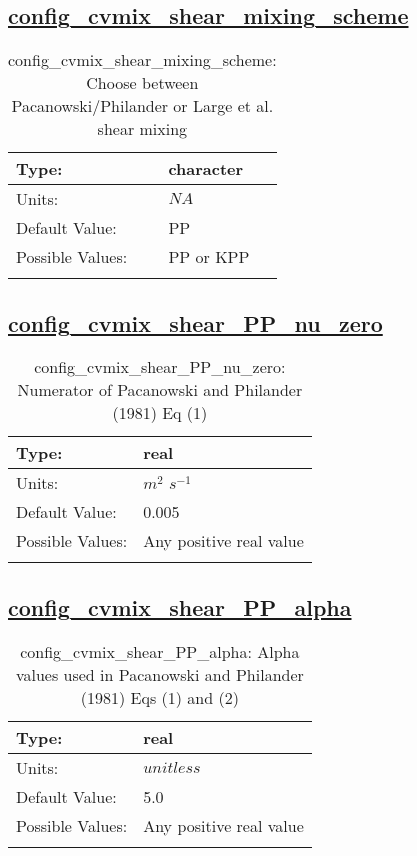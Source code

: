 \subsection[config\_cvmix\_shear\_mixing\_scheme]{\hyperref[sec:nm_tab_cvmix]{config\_cvmix\_shear\_mixing\_scheme}}
\label{subsec:nm_sec_config_cvmix_shear_mixing_scheme}
\begin{center}
\begin{longtable}{| p{2.0in} || p{4.0in} |}
    \hline
    Type: & character \\
    \hline
    Units: & $NA$ \\
    \hline
    Default Value: & PP \\
    \hline
    Possible Values: & PP or KPP \\
    \hline
    \caption{config\_cvmix\_shear\_mixing\_scheme: Choose between Pacanowski/Philander or Large et al. shear mixing}
\end{longtable}
\end{center}
\subsection[config\_cvmix\_shear\_PP\_nu\_zero]{\hyperref[sec:nm_tab_cvmix]{config\_cvmix\_shear\_PP\_nu\_zero}}
\label{subsec:nm_sec_config_cvmix_shear_PP_nu_zero}
\begin{center}
\begin{longtable}{| p{2.0in} || p{4.0in} |}
    \hline
    Type: & real \\
    \hline
    Units: & $m^2$ $s^{-1}$ \\
    \hline
    Default Value: & 0.005 \\
    \hline
    Possible Values: & Any positive real value \\
    \hline
    \caption{config\_cvmix\_shear\_PP\_nu\_zero: Numerator of Pacanowski and Philander (1981) Eq (1)}
\end{longtable}
\end{center}
\subsection[config\_cvmix\_shear\_PP\_alpha]{\hyperref[sec:nm_tab_cvmix]{config\_cvmix\_shear\_PP\_alpha}}
\label{subsec:nm_sec_config_cvmix_shear_PP_alpha}
\begin{center}
\begin{longtable}{| p{2.0in} || p{4.0in} |}
    \hline
    Type: & real \\
    \hline
    Units: & $unitless$ \\
    \hline
    Default Value: & 5.0 \\
    \hline
    Possible Values: & Any positive real value \\
    \hline
    \caption{config\_cvmix\_shear\_PP\_alpha: Alpha values used in Pacanowski and Philander (1981) Eqs (1) and (2)}
\end{longtable}
\end{center}
